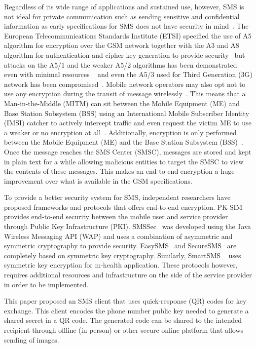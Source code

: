 \documentclass{report}
\begin{document}
Regardless of its wide range of applications and sustained use, however,
SMS is not ideal for private communication such as sending sensitive and
confidential information as early specifications for SMS does not have security
in mind~\cite{3gpp2}. The European Telecommunications Standards Institute (ETSI)
specified the use of A5 algorithm for encryption over the GSM network together
with the A3 and A8 algorithm for authentication and cipher key generation to
provide security~\cite{Schiller2011} but attacks on the A5/1 and the weaker
A5/2 algorithms has been demonstrated even with minimal resources
~\cite{a512001, a522007,Barkan_Biham_Keller_2003} and even the A5/3 used for
Third Generation (3G) network has been compromised~\cite{a532010}.
Mobile network operators may also opt not to use any encryption during the
transit of message wirelessly~\cite{gsm348}. This means that a
Man-in-the-Middle (MITM) can sit between the Mobile Equipment (ME) and
Base Station Subsystem (BSS) using an International Mobile Subscriber Identity
(IMSI) catcher to actively intercept traffic and even request the victim ME
to use a weaker or no encryption at all~\cite{Cattaneo_DeMaio_Faruolo_Petrillo_2013}.
Additionally, encryption is only performed between the Mobile Equipment (ME)
and the Base Station Subsystem (BSS)~\cite{Schiller2011}. Once the message
reaches the SMS Center (SMSC), messages are stored and kept in plain text for a
while allowing malicious entities to target the SMSC to
view the contents of these messages. This makes an end-to-end encryption a huge
improvement over what is available in the GSM specifications.

To provide a better security system for SMS, independent researchers have
proposed frameworks and protocols that offers end-to-end encryption.
PK-SIM~\cite{PKSIMcard07} provides end-to-end security between the mobile user
and service provider through Public Key Infrastructure (PKI).
SMSSec~\cite{SMSSec08} was developed using the Java Wireless Messaging API (WAP)
and uses a combination of asymmetric and symmetric cryptography to provide
security. EasySMS~\cite{EasySMS14} and SecureSMS~\cite{SecureSMS14} are
completely based on symmetric key cryptography. Similarly, SmartSMS
~\cite{SmartSMS16} uses symmetric key encryption for m-health application.
These protocols however, requires additional resources and infrastructure
on the side of the service provider in order to be implemented.

This paper proposed an SMS client that uses quick-response (QR) codes for
key exchange.  This client encodes the phone number
public key needed to generate a shared secret in a QR code. The generated
code can be shared to the intended recipient through offline (in person)
or other secure online platform that allows sending of images.
\end{document}
